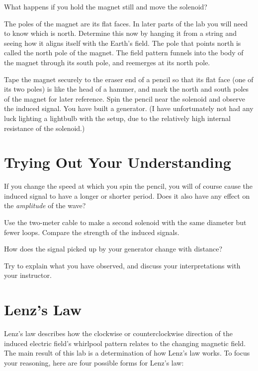 
What happens if you hold the magnet still and move the solenoid? 

The poles of the magnet are its flat faces. In later parts
of the lab you will need to know which is north. Determine
this now by hanging it from a string and seeing how it aligns itself with the Earth's field.
The pole that points north is called the north pole of the
magnet. The field pattern funnels into the body of the magnet
through its south pole, and reemerges at its north pole.


Tape the magnet securely to the eraser end of a pencil so
that its flat face (one of its two poles) is like the head
of a hammer, and mark the north and south poles of the
magnet for later reference. Spin the pencil near the
solenoid and observe the induced signal. You have built a
generator. (I have unfortunately not had any luck lighting a
lightbulb with the setup, due to the relatively high
internal resistance of the solenoid.)

\section*{Trying Out Your Understanding}


If you change the speed at which you spin the pencil, you
will of course cause the induced signal to have a longer or
shorter period. Does it also have any effect on the
\emph{amplitude} of the wave?


Use the two-meter cable to make a second solenoid with the
same diameter but fewer loops. Compare the strength of the
induced signals.


How does the signal picked up by your generator change with distance?

Try to explain what you have observed, and discuss your
interpretations with your instructor.

\section*{Lenz's Law}

Lenz's law describes how the clockwise or counterclockwise
direction of the induced electric field's whirl\-pool pattern
relates to the changing magnetic field. The main result of
this lab is a determination of how Lenz's law works. To
focus your reasoning, here are four possible forms for Lenz's law:

